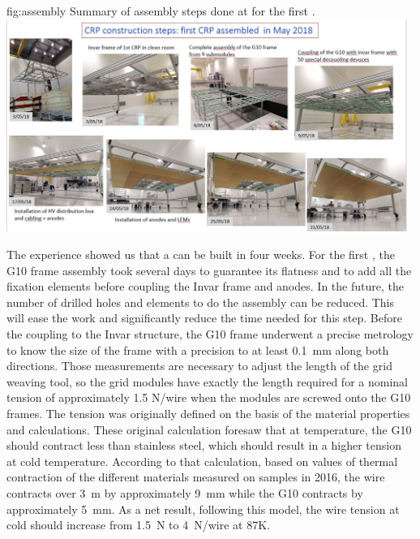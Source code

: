 \begin{dunefigure}
{fig:assembly}
{Summary of  assembly steps done at  for the first  .}
\includegraphics[width=0.98\textwidth]{graphics/CRP-steps}
\end{dunefigure}

The  experience showed us that a   can be built in four weeks. For the first , the G10 frame assembly 
took several days to guarantee its flatness and
 to add all the fixation elements before coupling the Invar frame and anodes. In the future, the number of drilled holes and elements to do the assembly can be reduced. This will ease the work and significantly reduce the time needed for this step.
Before the coupling to the Invar structure, the G10 frame underwent a precise metrology to know the size of the frame with a precision  to at least \SI{0.1}{mm}  along both directions. Those measurements are necessary  to adjust the length of the grid weaving tool, so the grid modules have exactly the length required for a 
nominal tension of approximately \num{1.5} N/wire when the modules are screwed onto the G10 frames.
The tension was originally defined on the basis of the material 
properties and calculations. These original 
calculation foresaw that at  temperature, the G10 should contract less than stainless steel,
which should result in a higher tension at cold temperature. According to that calculation,
 based on values of thermal contraction of the different materials measured on samples in 2016, 
the wire contracts over \SI{3}{m} by approximately \SI{9}{mm} while the G10 contracts by approximately \SI{5}{mm}. As a net result, following this model, 
the wire tension at cold should increase from \SI{1.5}{N} to \SI{4}{N/wire} at 87K.


